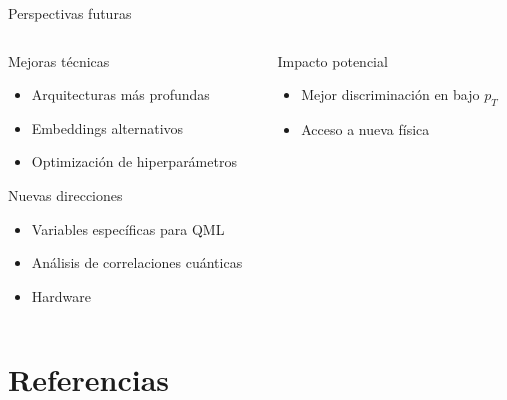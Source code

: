 \documentclass[aspectratio=43]{beamer}
\begin{document}
\begin{frame}{Perspectivas futuras}
  \begin{columns}
    \begin{column}{0.48\textwidth}
      \begin{block}{Mejoras técnicas}
        \begin{itemize}
          \item Arquitecturas más profundas
          \item Embeddings alternativos
          \item Optimización de hiperparámetros
        \end{itemize}
      \end{block}
      \vspace{-0.2em}
      \begin{alertblock}{Nuevas direcciones}
        \begin{itemize}
          \item Variables específicas para QML
          \item Análisis de correlaciones cuánticas
          \item Hardware
        \end{itemize}
      \end{alertblock}
    \end{column}
    \begin{column}{0.48\textwidth}
      \begin{block}{Impacto potencial}
        \begin{itemize}
          \item Mejor discriminación en bajo \texorpdfstring{$p_T$}{pT}
          \item Acceso a nueva física
        \end{itemize}
      \end{block}
    \end{column}
  \end{columns}
\end{frame}

\section{Referencias}
\end{document}
